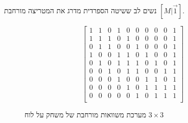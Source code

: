 \documentclass[12pt,leqno]{article}
\begin{document}
נשים לב ששיטה הספרדית מדרג את המטריצה מורחבת 
$[M | \vec{1}]$.

\begin{figure}
    \caption{
        מערכת משוואות מורחבת של משחק על לוח 
        $3 \times 3$
    }
    \label{fig: full matrix 3 x 3}
    \begin{english}
        \begin{center}
            \[
            \left[
            \begin{array}{ccccccccc|c}
                    1& 1& 0& 1& 0& 0& 0& 0& 0& 1 \\
                    1& 1& 1& 0& 1& 0& 0& 0& 0& 1 \\
                    0& 1& 1& 0& 0& 1& 0& 0& 0& 1 \\
                    1& 0& 0& 1& 1& 0& 1& 0& 0& 1 \\
                    0& 1& 0& 1& 1& 1& 0& 1& 0& 1 \\
                    0& 0& 1& 0& 1& 1& 0& 0& 1& 1 \\
                    0& 0& 0& 1& 0& 0& 1& 1& 0& 1 \\
                    0& 0& 0& 0& 1& 0& 1& 1& 1& 1 \\
                    0& 0& 0& 0& 0& 1& 0& 1& 1& 1 \\
            \end{array}
            \right]
            \]
        \end{center}
    \end{english}
\end{figure}
\end{document}
